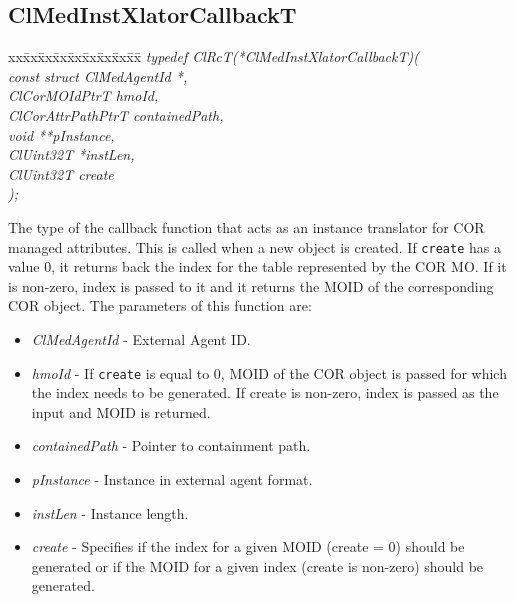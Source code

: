 \begin{flushleft}
\subsection{ClMedInstXlatorCallbackT}
\begin{tabbing}
xx\=xx\=xx\=xx\=xx\=xx\=xx\=xx\=xx\=\kill
\textit{typedef ClRcT(*ClMedInstXlatorCallbackT)(}\\
\>\>\>\>\textit{const struct ClMedAgentId *,}\\
\>\>\>\>\textit{ClCorMOIdPtrT hmoId, }\\
\>\>\>\>\textit{ClCorAttrPathPtrT containedPath,}\\
\>\>\>\>\textit{void **pInstance,}\\
\>\>\>\>\textit{ClUint32T *instLen,}\\
\>\>\>\>\textit{ClUint32T create}\\
\textit{);}\end{tabbing}
The type of the callback function that acts as an instance translator for COR managed attributes. This is called when a new object is created. If {\tt{create}} 
has a value 0, it  returns back the index for the table represented by the COR MO. If it is non-zero, index is passed to it and it returns the MOID of 
the corresponding COR object. 
The parameters of this function are:
\begin{itemize}
\item
\textit{ClMedAgentId} - External Agent ID.
\item
\textit{hmoId} - If {\tt{create}} is equal to 0, MOID of the COR object is passed for which the index needs to be generated. If create is non-zero, index
is passed as the input and MOID is returned.
\item
\textit{containedPath} - Pointer to containment path.
\item
\textit{pInstance} - Instance in external agent format.
\item
\textit{instLen} - Instance length.
\item
\textit{create} - Specifies if the index for a given MOID (create = 0) should be generated or if the MOID for a given index (create is non-zero) 
should be generated.

\end{itemize}



\end{flushleft}
